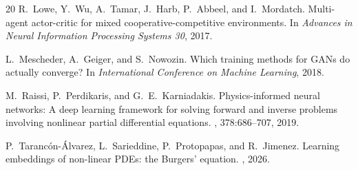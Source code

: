 \documentclass[twoside,11pt]{article}
\begin{document}
\begin{thebibliography}{20}
R.~Lowe, Y.~Wu, A.~Tamar, J.~Harb, P.~Abbeel, and I.~Mordatch.
\newblock Multi-agent actor-critic for mixed cooperative-competitive
environments.
\newblock In {\em Advances in Neural Information Processing
Systems 30}, 2017.

L.~Mescheder, A.~Geiger, and S.~Nowozin.
\newblock Which training methods for {GANs} do actually converge?
\newblock In {\em International Conference on Machine Learning},
2018.

M.~Raissi, P.~Perdikaris, and G.~E.~Karniadakis.
\newblock Physics-informed neural networks: A deep learning
framework for solving forward and inverse problems involving
nonlinear partial differential equations.
, 378:686--707,
2019.

P.~Tarancón-Álvarez, L.~Sarieddine, P.~Protopapas, and R.~Jimenez.
\newblock Learning embeddings of non-linear {PDEs}: the {Burgers'}
equation.
, 2026.

\end{thebibliography}
\end{document}
